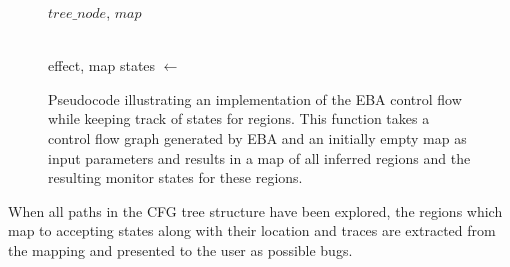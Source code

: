 \begin{figure}[H]
    \centering
    \begin{algorithm}[H]
    \begin{algorithmic}
         {$tree\_node$, $map$} 
                \EndIf
                
            \EndIf      
        \EndFunction
        \\
         {effect, map}
            \State states $\gets$ 
        \EndFunction
        \\
    \end{algorithmic}
    \end{algorithm}
    \caption{Pseudocode illustrating an implementation of the EBA control flow while keeping track of states for regions. This function takes a control flow graph generated by EBA and an initially empty map as input parameters and results in a map of all inferred regions and the resulting monitor states for these regions.}
    \label{explore_tree-implementation}
\end{figure}

\newpar When all paths in the CFG tree structure have been explored, the regions which map to accepting states along with their location and traces are extracted from the mapping and presented to the user as possible bugs.  

